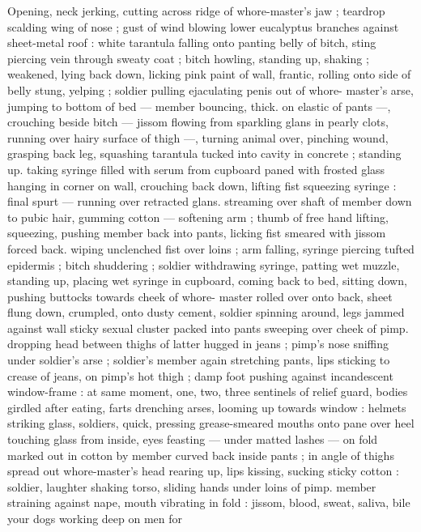 Opening, neck jerking, cutting across ridge of whore-master's jaw ; 
teardrop scalding wing of nose ; gust of wind blowing lower 
eucalyptus branches against sheet-metal roof : white tarantula 
falling onto panting belly of bitch, sting piercing vein through sweaty 
coat ; bitch howling, standing up, shaking ; weakened, lying back 
down, licking pink paint of wall, frantic, rolling onto side of belly 
stung, yelping ; soldier pulling ejaculating penis out of whore- 
master's arse, jumping to bottom of bed --- member bouncing, thick. 
on elastic of pants ---, crouching beside bitch --- jissom flowing from 
sparkling glans in pearly clots, running over hairy surface of thigh 
---, turning animal over, pinching wound, grasping back leg, 
squashing tarantula tucked into cavity in concrete ; standing up. 
taking syringe filled with serum from cupboard paned with frosted 
glass hanging in corner on wall, crouching back down, lifting fist 
squeezing syringe : final spurt --- running over retracted glans. 
streaming over shaft of member down to pubic hair, gumming cotton 
--- softening arm ; thumb of free hand lifting, squeezing, pushing 
member back into pants, licking fist smeared with jissom forced back. 
wiping unclenched fist over loins ; arm falling, syringe piercing tufted 
epidermis ; bitch shuddering ; soldier withdrawing syringe, patting 
wet muzzle, standing up, placing wet syringe in cupboard, coming 
back to bed, sitting down, pushing buttocks towards cheek of whore- 
master rolled over onto back, sheet flung down, crumpled, onto 
dusty cement, soldier spinning around, legs jammed against wall 
sticky sexual cluster packed into pants sweeping over cheek of pimp. 
dropping head between thighs of latter hugged in jeans ; pimp's 
nose sniffing under soldier's arse ; soldier's member again 
stretching pants, lips sticking to crease of jeans, on pimp's hot thigh 
; damp foot pushing against incandescent window-frame : at same 
moment, one, two, three sentinels of relief guard, bodies girdled 
after eating, farts drenching arses, looming up towards window : 
helmets striking glass, soldiers, quick, pressing grease-smeared 
mouths onto pane over heel touching glass from inside, eyes 
feasting --- under matted lashes --- on fold marked out in cotton by 
member curved back inside pants ; in angle of thighs spread out 
whore-master's head rearing up, lips kissing, sucking sticky cotton : 
soldier, laughter shaking torso, sliding hands under loins of pimp. 
member straining against nape, mouth vibrating in fold : {\thd} {\gl} jissom, 
blood, sweat, saliva, bile{\td} your dogs working deep on men{\thd} for 
